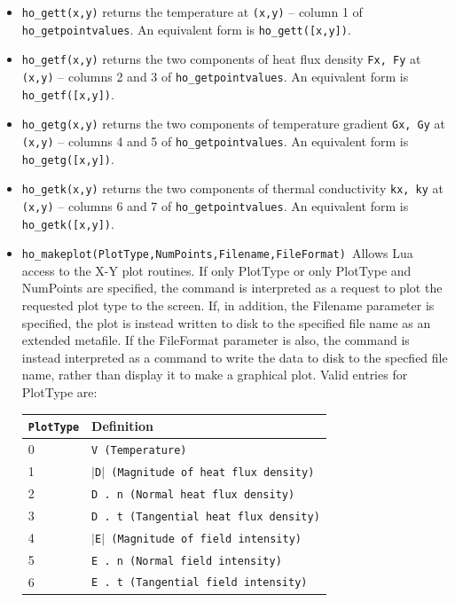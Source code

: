 \begin{itemize}
Example: To catch all values at (0.01,0) use

\texttt{T,Fx,Fy,Gx,Gy,kx,ky= ho\_getpointvalues(0.01,0) }

\item{\tt ho\_gett(x,y)} returns the temperature at {\tt (x,y)} -- column 1 of {\tt ho\_getpointvalues}. An equivalent form is {\tt ho\_gett([x,y])}.

\item{\tt ho\_getf(x,y)} returns the two components of heat flux density {\tt Fx, Fy} at {\tt (x,y)} -- columns 2 and 3 of {\tt ho\_getpointvalues}. An equivalent form is {\tt ho\_getf([x,y])}.

\item{\tt ho\_getg(x,y)} returns the two components of temperature gradient {\tt Gx, Gy} at {\tt (x,y)} -- columns 4 and 5 of {\tt ho\_getpointvalues}. An equivalent form is {\tt ho\_getg([x,y])}.

\item{\tt ho\_getk(x,y)} returns the two components of thermal conductivity {\tt kx, ky} at {\tt (x,y)} -- columns 6 and 7 of {\tt ho\_getpointvalues}. An equivalent form is {\tt ho\_getk([x,y])}.

\item \texttt{ho\_makeplot(PlotType,NumPoints,Filename,FileFormat) }Allows Lua access
to the X-Y plot routines. If only PlotType or only PlotType and NumPoints
are specified, the command is interpreted as a request to plot the requested
plot type to the screen. If, in addition, the Filename parameter is
specified, the plot is instead written to disk to the specified file name as
an extended metafile. If the FileFormat parameter is also, the command is
instead interpreted as a command to write the data to disk to the specfied
file name, rather than display it to make a graphical plot. Valid entries
for PlotType are:

\begin{tabular}{ll}
\texttt{PlotType} &  Definition \\ \hline
 0 & \texttt{V (Temperature)} \\
 1 & \texttt{$\vert$D$\vert$ (Magnitude of heat flux density)} \\
 2 & \texttt{D . n (Normal heat flux density)} \\
 3 & \texttt{D . t (Tangential heat flux density)} \\
 4 & \texttt{$\vert$E$\vert$ (Magnitude of field intensity)} \\
 5 & \texttt{E . n (Normal field intensity)} \\
 6 & \texttt{E . t (Tangential field intensity)}
\end{tabular}


\end{itemize}
